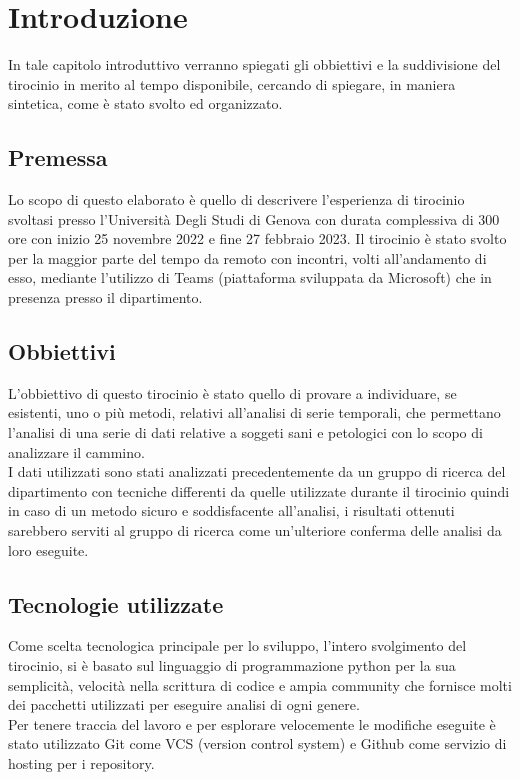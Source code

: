 \section{Introduzione}
In tale capitolo introduttivo verranno spiegati gli obbiettivi e la suddivisione del tirocinio
in merito al tempo disponibile, cercando di spiegare, in maniera sintetica, come è stato
svolto ed organizzato.

\subsection{Premessa}
Lo scopo di questo elaborato è quello di descrivere l'esperienza di tirocinio svoltasi presso
l'Università Degli Studi di Genova con durata complessiva di 300 ore con inizio 25 novembre 2022
e fine 27 febbraio 2023. Il tirocinio è stato svolto per la maggior parte del tempo da remoto
con incontri, volti all'andamento di esso, mediante l'utilizzo di Teams (piattaforma sviluppata da Microsoft)
che in presenza presso il dipartimento. 

\subsection{Obbiettivi}
L'obbiettivo di questo tirocinio è stato quello di provare a individuare, se esistenti, uno o più metodi, 
relativi all'analisi di serie temporali, che permettano l'analisi di una serie di 
dati relative a soggeti sani e petologici con lo scopo di analizzare il cammino.
\\
I dati utilizzati sono stati analizzati precedentemente da un gruppo di ricerca del dipartimento
con tecniche differenti da quelle utilizzate durante il tirocinio
quindi in caso di un metodo sicuro e soddisfacente all'analisi, i risultati ottenuti sarebbero
serviti al gruppo di ricerca come un'ulteriore conferma delle analisi da loro eseguite.

\subsection{Tecnologie utilizzate}
Come scelta tecnologica principale per lo sviluppo, l'intero svolgimento del tirocinio, si è basato sul linguaggio di
programmazione python per la sua semplicità, velocità nella scrittura di codice e
ampia community che fornisce molti dei pacchetti utilizzati per eseguire analisi di ogni genere.\\
Per tenere traccia del lavoro e per esplorare velocemente le modifiche eseguite è stato utilizzato
Git come VCS (version control system) e Github come servizio di hosting per i repository.

